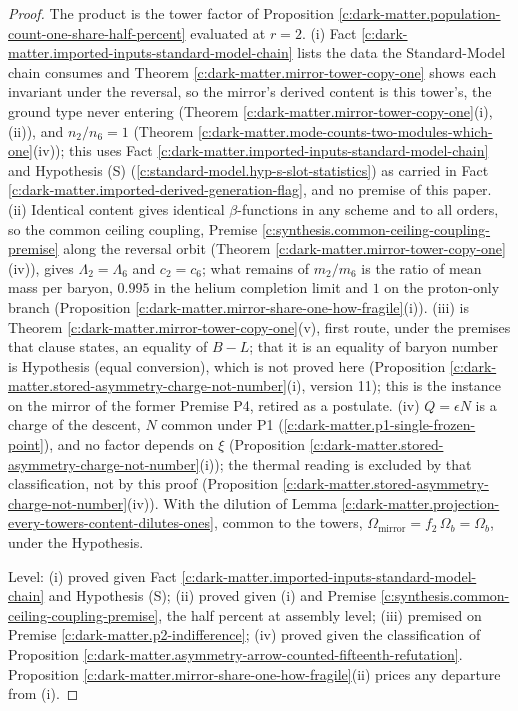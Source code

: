 \documentclass[11pt]{article}
\theoremstyle{definition}
\theoremstyle{plain}
\begin{document}
\begin{proof}
The product is the tower factor of Proposition \ref{c:dark-matter.population-count-one-share-half-percent} evaluated at $r = 2$. (i) Fact \ref{c:dark-matter.imported-inputs-standard-model-chain} lists the data the Standard-Model chain consumes and Theorem \ref{c:dark-matter.mirror-tower-copy-one} shows each invariant under the reversal, so the mirror's derived content is this tower's, the ground type never entering (Theorem \ref{c:dark-matter.mirror-tower-copy-one}(i), (ii)), and $n_{2}/n_{6} = 1$ (Theorem \ref{c:dark-matter.mode-counts-two-modules-which-one}(iv)); this uses Fact \ref{c:dark-matter.imported-inputs-standard-model-chain} and Hypothesis (S) (\ref{c:standard-model.hyp-s-slot-statistics}) as carried in Fact \ref{c:dark-matter.imported-derived-generation-flag}, and no premise of this paper. (ii) Identical content gives identical $\beta$-functions in any scheme and to all orders, so the common ceiling coupling, Premise \ref{c:synthesis.common-ceiling-coupling-premise} along the reversal orbit (Theorem \ref{c:dark-matter.mirror-tower-copy-one}(iv)), gives $\Lambda_{2} = \Lambda_{6}$ and $c_{2} = c_{6}$; what remains of $m_{2}/m_{6}$ is the ratio of mean mass per baryon, $0.995$ in the helium completion limit and $1$ on the proton-only branch (Proposition \ref{c:dark-matter.mirror-share-one-how-fragile}(i)). (iii) is Theorem \ref{c:dark-matter.mirror-tower-copy-one}(v), first route, under the premises that clause states, an equality of $B - L$; that it is an equality of baryon number is Hypothesis (equal conversion), which is not proved here (Proposition \ref{c:dark-matter.stored-asymmetry-charge-not-number}(i), version 11); this is the instance on the mirror of the former Premise P4, retired as a postulate. (iv) $Q = \epsilon N$ is a charge of the descent, $N$ common under P1 (\ref{c:dark-matter.p1-single-frozen-point}), and no factor depends on $\xi$ (Proposition \ref{c:dark-matter.stored-asymmetry-charge-not-number}(i)); the thermal reading is excluded by that classification, not by this proof (Proposition \ref{c:dark-matter.stored-asymmetry-charge-not-number}(iv)). With the dilution of Lemma \ref{c:dark-matter.projection-every-towers-content-dilutes-ones}, common to the towers, $\Omega_{\mathrm{mirror}} = f_{2}\,\Omega_{b} = \Omega_{b}$, under the Hypothesis.

Level: (i) proved given Fact \ref{c:dark-matter.imported-inputs-standard-model-chain} and Hypothesis (S); (ii) proved given (i) and Premise \ref{c:synthesis.common-ceiling-coupling-premise}, the half percent at assembly level; (iii) premised on Premise \ref{c:dark-matter.p2-indifference}; (iv) proved given the classification of Proposition \ref{c:dark-matter.asymmetry-arrow-counted-fifteenth-refutation}. Proposition \ref{c:dark-matter.mirror-share-one-how-fragile}(ii) prices any departure from (i).

\end{proof}
\end{document}
